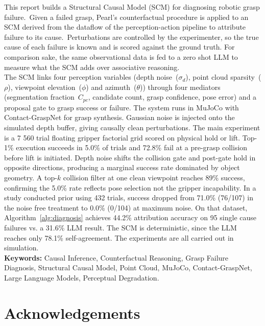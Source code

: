 \documentclass[11pt,a4paper]{report}
\begin{document}
This report builds a Structural Causal Model (SCM) for diagnosing robotic grasp failure.~Given a failed grasp, Pearl's counterfactual procedure is applied to an SCM derived from the dataflow of the perception-action pipeline to attribute failure to its cause.~Perturbations are controlled by the experimenter, so the true cause of each failure is known and is scored against the ground truth. For comparison sake, the same observational data is fed to a zero shot LLM to measure what the SCM adds over associative reasoning.\\

\noindent The SCM links four perception variables (depth noise~($\sigma_d$), point cloud sparsity~($\rho$), viewpoint elevation~($\phi$) and azimuth~($\theta$)) through four mediators (segmentation fraction~$C_{pc}$, candidate count, grasp confidence, pose error) and a proposal gate to grasp success or failure. The system runs in MuJoCo with Contact-GraspNet for grasp synthesis. Gaussian noise is injected onto the simulated depth buffer, giving causally clean perturbations. The main experiment is a 7 560 trial floating gripper factorial grid scored on physical hold or lift. Top-1\% execution succeeds in 5.0\% of trials and 72.8\% fail at a pre-grasp collision before lift is initiated. Depth noise shifts the collision gate and post-gate hold in opposite directions, producing a marginal success rate dominated by object geometry. A top-$k$ collision filter at one clean viewpoint reaches 89\% success, confirming the 5.0\% rate reflects pose selection not the gripper incapability. In a study conducted prior using 432 trials, success dropped from 71.0\% (76/107) in the noise free treatment to 0.0\% (0/104) at maximum noise. On that dataset, Algorithm~\ref{alg:diagnosis} achieves 44.2\% attribution accuracy on 95 single cause failures vs. a 31.6\% LLM result. The SCM is deterministic, since the LLM reaches only 78.1\% self-agreement. The experiments are all carried out in simulation.\\

\noindent \textbf{Keywords:} Causal Inference, Counterfactual Reasoning, Grasp Failure Diagnosis, Structural Causal Model, Point Cloud, MuJoCo, Contact-GraspNet, Large Language Models, Perceptual Degradation.

\chapter*{Acknowledgements}
\end{document}
